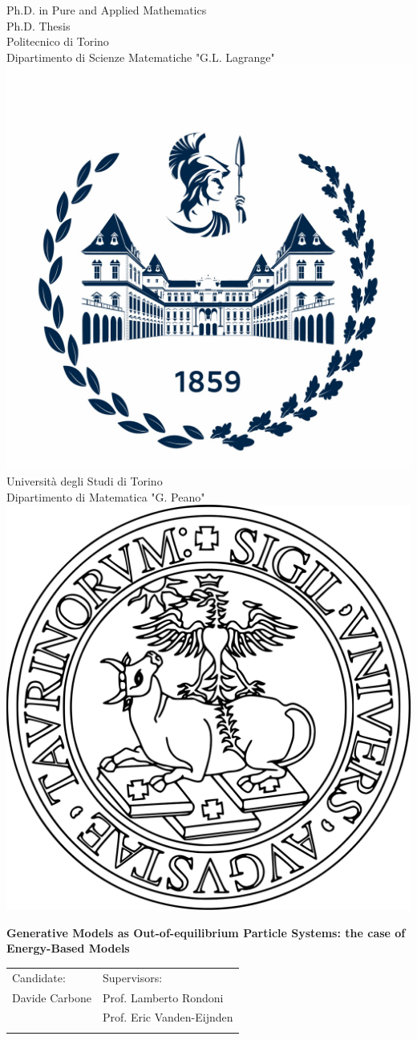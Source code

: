 \documentclass[b5paper, 10 pt, twoside]{book}
\numberwithin{equation}{section}
\theoremstyle{plain}
\theoremstyle{definition}
\theoremstyle{definition}
\theoremstyle{remark}
\begin{document}
\begin{titlepage}
\begin{center}
{\Large Ph.D. in Pure and Applied Mathematics} \\
\vspace{3 mm}
{\large Ph.D. Thesis} \\
\vspace{1.5 cm}
{\large Politecnico di Torino} \\
\vspace{2 mm}
{Dipartimento di Scienze Matematiche "G.L. Lagrange"} \\
\vspace{3 mm}
\includegraphics[width=0.25 \textwidth]{Figures/polito.jpg}\\
\vspace{4 mm}
{\large Università degli Studi di Torino} \\
\vspace{2 mm}
{Dipartimento di Matematica "G. Peano"} \\
\vspace{3 mm}
\includegraphics[width=0.2 \textwidth]{Figures/unitologo.png}\\
\vspace{.7cm}
\begin{center}
\LARGE{\textbf{Generative Models as Out-of-equilibrium Particle Systems: the case of Energy-Based Models}}
\end{center}
\vfill
\vspace{.9cm}

\begin{tabular}{l l}
\large Candidate: \hspace{2.5cm} & \large Supervisors: \\
\vspace{1mm}
\Large Davide Carbone \hspace{2.5cm} & \Large Prof. Lamberto Rondoni\\
\hspace{5.5cm} & \Large Prof. Eric Vanden-Eijnden\\
\vspace*{-1cm}
\end{tabular}


\end{center}
\end{titlepage}
\end{document}
